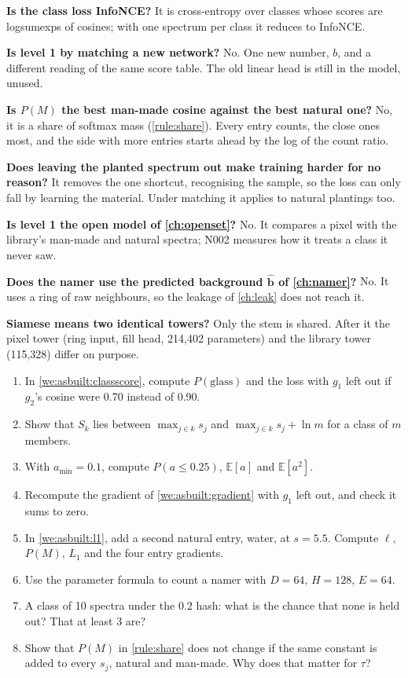 \documentclass[11pt,a4paper,oneside,openany]{book}
\newcommand{\B}[1]{{\symbf{#1}}}
\newcommand{\B}[1]{{\bm{#1}}}
\newcommand{\E}{\mathbb{E}}
\newcommand{\vbh}{\hat{\B{b}}}
\begin{document}
\begin{confusions}
\textbf{Is the class loss InfoNCE?} It is cross-entropy over classes whose scores are logsumexps of cosines; with one spectrum per class it reduces to InfoNCE.

\textbf{Is level 1 by matching a new network?} No. One new number, $b$, and a different reading of the same score table. The old linear head is still in the model, unused.

\textbf{Is $P(M)$ the best man-made cosine against the best natural one?} No, it is a share of softmax mass (\cref{rule:share}). Every entry counts, the close ones most, and the
side with more entries starts ahead by the log of the count ratio.

\textbf{Does leaving the planted spectrum out make training harder for no reason?} It removes the one shortcut, recognising the sample, so the loss can only fall by
learning the material. Under matching it applies to natural plantings too.

\textbf{Is level 1 the open model of \cref{ch:openset}?} No. It compares a pixel with the library's man-made and natural spectra; N002 measures how it treats a class it
never saw.

\textbf{Does the namer use the predicted background $\vbh$ of \cref{ch:namer}?} No. It uses a ring of raw neighbours, so the leakage of \cref{ch:leak} does not reach it.

\textbf{Siamese means two identical towers?} Only the stem is shared. After it the pixel tower (ring input, fill head, 214,402 parameters) and the library tower (115,328)
differ on purpose.
\end{confusions}

\begin{checkyourself}
\begin{enumerate}
\item In \cref{we:asbuilt:classscore}, compute $P(\text{glass})$ and the loss with $g_1$ left out if $g_2$'s cosine were 0.70 instead of 0.90.
\item Show that $S_k$ lies between $\max_{j\in k}s_j$ and $\max_{j\in k}s_j+\ln m$ for a class of $m$ members.
\item With $a_{\min}=0.1$, compute $P(a\le0.25)$, $\E[a]$ and $\E[a^2]$.
\item Recompute the gradient of \cref{we:asbuilt:gradient} with $g_1$ left out, and check it sums to zero.
\item In \cref{we:asbuilt:l1}, add a second natural entry, water, at $s=5.5$. Compute $\ell$, $P(M)$, $L_1$ and the four entry gradients.
\item Use the parameter formula to count a namer with $D=64$, $H=128$, $E=64$.
\item A class of 10 spectra under the 0.2 hash: what is the chance that none is held out? That at least 3 are?
\item Show that $P(M)$ in \cref{rule:share} does not change if the same constant is added to every $s_j$, natural and man-made. Why does that matter for $\tau$?
\end{enumerate}
\end{checkyourself}
\end{document}
